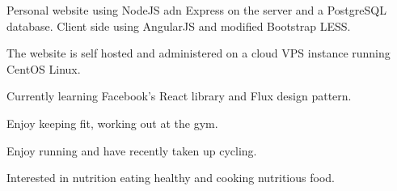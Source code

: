 \documentclass[a4paper]{deedy-resume} %
\begin{document}
\begin{minipage}[t]{0.66\textwidth}
\begin{tightitemize}
\item Personal website using NodeJS adn Express on the server and a PostgreSQL database. Client side using AngularJS and modified Bootstrap LESS.
\item The website is self hosted and administered on a cloud VPS instance running CentOS Linux.
\item Currently learning Facebook's React library and Flux design pattern.
\end{tightitemize}
\sectionspace %


\descript{}
\begin{tightitemize}
\item Enjoy keeping fit, working out at the gym.
\item Enjoy running and have recently taken up cycling.
\item Interested in nutrition eating healthy and cooking nutritious food.
\end{tightitemize}
\sectionspace %


\end{minipage} %

\end{document}
